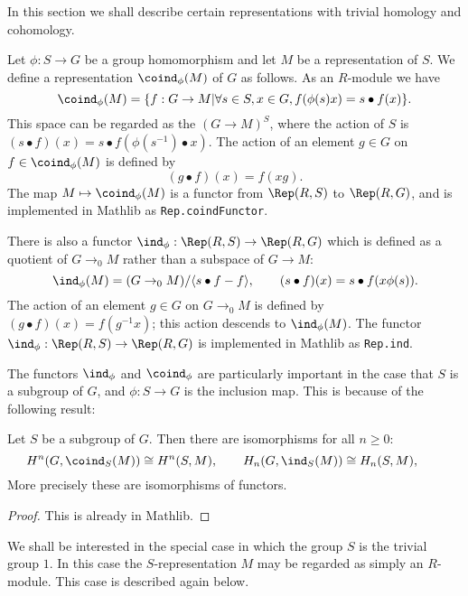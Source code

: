 In this section we shall describe certain representations with trivial homology and cohomology.

Let $\phi : S \to G$ be a group homomorphism and let $M$ be a representation of $S$.
We define a representation $\coind_\phi(M)$ of $G$ as follows.
As an $R$-module we have
\[
	\coind_\phi(M) =
	\{ f : G \to M| \forall s \in S, x \in G, f(\phi(s)x) = s \bullet f(x)\}.
\]
This space can be regarded as the $(G \to M)^S$, where the action of $S$ is
$(s\bullet f)(x)=s \bullet f(\phi(s^{-1})\bullet x)$.
The action of an element $g \in G$ on $f \in \coind_\phi(M)$ is defined by
\[
	(g \bullet f)(x) = f(xg).
\]
The map $M \mapsto \coind_\phi(M)$ is a functor from $\Rep(R,S)$ to $\Rep(R,G)$, and is implemented
in Mathlib as \texttt{Rep.coindFunctor}.

There is also a functor $\ind_\phi : \Rep(R,S) \to \Rep(R,G)$ which is defined as a quotient of
$G \to_0 M$ rather than a subspace of $G \to M$:
\[
	\ind_\phi(M) = (G \to_0 M) / \langle s \bullet f - f\rangle,
	\qquad
	(s \bullet f) (x) = s \bullet f (x \phi(s)).
\]
The action of an element $g \in G$ on $G \to_0 M$ is defined by $(g \bullet f)(x) = f(g^{-1} x)$;
this action descends to $\ind_\phi(M)$.
The functor $\ind_\phi : \Rep(R,S) \to \Rep(R,G)$ is implemented in Mathlib as
\texttt{Rep.ind}.

The functors $\ind_\phi$ and $\coind_\phi$ are particularly important in the case that
$S$ is a subgroup of $G$, and $\phi : S \to G$ is the inclusion map. This is because of the
following result:

\begin{lemma}  \label{lem:Shapiro}
	\mathlibok
	Let $S$ be a subgroup of $G$. Then there are isomorphisms for all $n \ge 0$:
	\[
		H^n(G,\coind_S(M)) \cong H^n(S,M), \qquad
		H_n(G,\ind_S(M)) \cong H_n(S,M), \qquad
	\]
	More precisely these are isomorphisms of functors.
\end{lemma}

\begin{proof}
	This is already in Mathlib.
	\mathlibok
\end{proof}

We shall be interested in the special case in which the group $S$ is the
trivial group $1$. In this case the $S$-representation $M$ may be regarded as simply an $R$-module.
This case is described again below.

